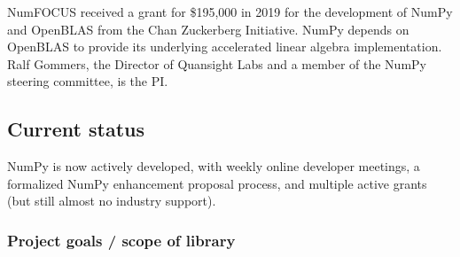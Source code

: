\documentclass[fleqn,10pt]{wlscirep}
\begin{document}



NumFOCUS received a grant for \$195,000 in 2019 for the development of NumPy
and OpenBLAS from the Chan Zuckerberg Initiative. 
NumPy depends on OpenBLAS to provide its underlying accelerated linear algebra implementation.
Ralf Gommers, the Director of Quansight Labs and a member of
the NumPy steering committee, is the PI.




\subsection*{Current status}

NumPy is now actively developed, with weekly online developer
meetings, a formalized NumPy enhancement proposal process, and
multiple active grants (but still almost no industry support).


\subsubsection*{Project goals / scope of library}

\end{document}
